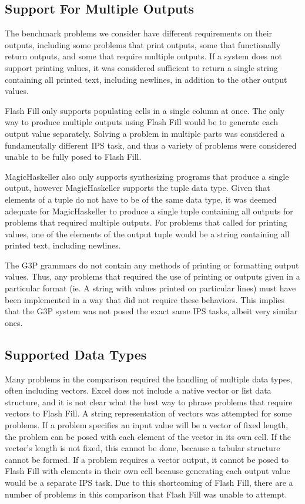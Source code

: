 \subsection{Support For Multiple Outputs}

The benchmark problems we consider have different requirements on their outputs, including some problems that print outputs, some that functionally return outputs, and some that require multiple outputs. If a system does not support printing values, it was considered sufficient to return a single string containing all printed text, including newlines, in addition to the other output values.

Flash Fill only supports populating cells in a single column at once. The only way to produce multiple outputs using Flash Fill would be to generate each output value separately. Solving a problem in multiple parts was considered a fundamentally different IPS task, and thus a variety of problems were considered unable to be fully posed to Flash Fill.

MagicHaskeller also only supports synthesizing programs that produce a single output, however MagicHaskeller supports the tuple data type. Given that elements of a tuple do not have to be of the same data type, it was deemed adequate for MagicHaskeller to produce a single tuple containing all outputs for problems that required multiple outputs. For problems that called for printing values, one of the elements of the output tuple would be a string containing all printed text, including newlines.

The G3P grammars do not contain any methods of printing or formatting output values. Thus, any problems that required the use of printing or outputs given in a particular format (ie. A string with values printed on particular lines) must have been implemented in a way that did not require these behaviors. This implies that the G3P system was not posed the exact same IPS tasks, albeit very similar ones.

\subsection{Supported Data Types}

Many problems in the comparison required the handling of multiple data types, often including vectors.  Excel does not include a native vector or list data structure, and it is not clear what the best way to phrase problems that require vectors to Flash Fill. A string representation of vectors was attempted for some problems. If a problem specifies an input value will be a vector of fixed length, the problem can be posed with each element of the vector in its own cell. If the vector's length is not fixed, this cannot be done, because a tabular structure cannot be formed. If a problem requires a vector output, it cannot be posed to Flash Fill with elements in their own cell because generating each output value would be a separate IPS task. Due to this shortcoming of Flash Fill, there are a number of problems in this comparison that Flash Fill was unable to attempt.

